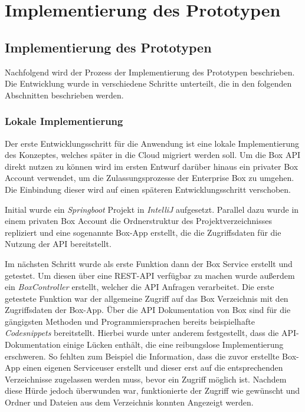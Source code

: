 \chapter{Implementierung des Prototypen}

\section{Implementierung des Prototypen}

Nachfolgend wird der Prozess der Implementierung des Prototypen beschrieben. Die Entwicklung wurde in verschiedene Schritte unterteilt, die in den folgenden Abschnitten beschrieben werden.

\subsection{Lokale Implementierung}
Der erste Entwicklungsschritt für die Anwendung ist eine lokale Implementierung des Konzeptes, welches später in die Cloud migriert werden soll. Um die Box \ac{API} direkt nutzen zu können wird im ersten Entwurf darüber hinaus ein privater Box Account verwendet, um die Zulassungsprozesse der Enterprise Box zu umgehen. Die Einbindung dieser wird auf einen späteren Entwicklungsschritt verschoben.

Initial wurde ein \textit{\gls{Springboot}} Projekt in \textit{\gls{IntelliJ}} aufgesetzt. Parallel dazu wurde in einem privaten Box Account die Ordnerstruktur des Projektverzeichnisses repliziert und eine sogenannte Box-App erstellt, die die Zugriffsdaten für die Nutzung der \ac{API} bereitstellt.

Im nächsten Schritt wurde als erste Funktion dann der Box Service erstellt und getestet. Um diesen über eine \ac{REST}-\ac{API} verfügbar zu machen wurde außerdem ein \textit{BoxController} erstellt, welcher die \ac{API} Anfragen verarbeitet. Die erste getestete Funktion war der allgemeine Zugriff auf das Box Verzeichnis mit den Zugriffsdaten der Box-App. Über die \ac{API} Dokumentation von Box sind für die gängigsten Methoden und Programmiersprachen bereits beispielhafte \textit{Codesnippets} bereitstellt. Hierbei wurde unter anderem festgestellt, dass die \ac{API}-Dokumentation einige Lücken enthält, die eine reibungslose Implementierung erschweren. So fehlten zum Beispiel die Information, dass die zuvor erstellte Box-App einen eigenen Serviceuser erstellt und dieser erst auf die entsprechenden Verzeichnisse zugelassen werden muss, bevor ein Zugriff möglich ist. Nachdem diese Hürde jedoch überwunden war, funktionierte der Zugriff wie gewünscht und Ordner und Dateien aus dem Verzeichnis konnten Angezeigt werden.


